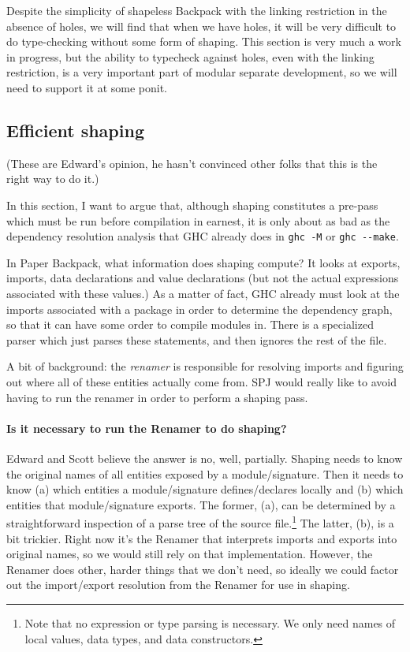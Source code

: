 \documentclass{article}
\begin{document}
Despite the simplicity of shapeless Backpack with the linking
restriction in the absence of holes, we will find that when we have
holes, it will be very difficult to do type-checking without
some form of shaping.  This section is very much a work in progress,
but the ability to typecheck against holes, even with the linking restriction,
is a very important part of modular separate development, so we will need
to support it at some ponit.

\subsection{Efficient shaping}

(These are Edward's opinion, he hasn't convinced other folks that this is
the right way to do it.)

In this section, I want to argue that, although shaping constitutes
a pre-pass which must be run before compilation in earnest, it is only
about as bad as the dependency resolution analysis that GHC already does
in \verb|ghc -M| or \verb|ghc --make|.

In Paper Backpack, what information does shaping compute? It looks at
exports, imports, data declarations and value declarations (but not the
actual expressions associated with these values.)  As a matter of fact,
GHC already must look at the imports associated with a package in order
to determine the dependency graph, so that it can have some order to compile
modules in.  There is a specialized parser which just parses these statements,
and then ignores the rest of the file.

A bit of background: the \emph{renamer} is responsible for resolving
imports and figuring out where all of these entities actually come from.
SPJ would really like to avoid having to run the renamer in order to perform
a shaping pass.

\paragraph{Is it necessary to run the Renamer to do shaping?}
Edward and Scott believe the answer is no, well, partially.
Shaping needs to know the original names of all entities exposed by a
module/signature. Then it needs to know (a) which entities a module/signature
defines/declares locally and (b) which entities that module/signature exports.
The former, (a), can be determined by a straightforward inspection of a parse
tree of the source file.\footnote{Note that no expression or type parsing
is necessary. We only need names of local values, data types, and data
constructors.} The latter, (b), is a bit trickier. Right now it's the Renamer
that interprets imports and exports into original names, so we would still
rely on that implementation. However, the Renamer does other, harder things
that we don't need, so ideally we could factor out the import/export
resolution from the Renamer for use in shaping.
\end{document}
